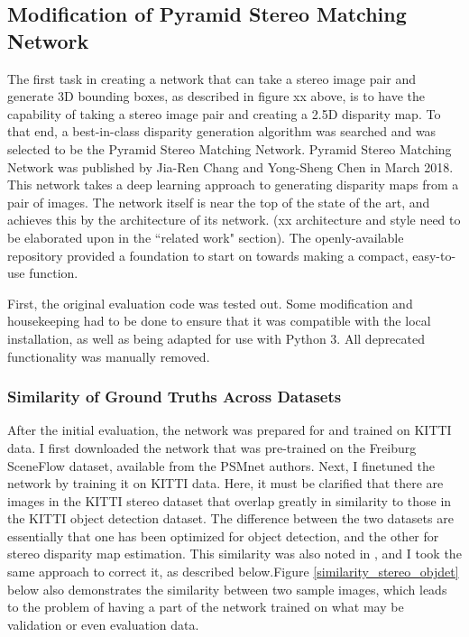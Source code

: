 \subsection{Modification of Pyramid Stereo Matching Network}
The first task in creating a network that can take a stereo image pair and generate 3D bounding boxes, as described in figure xx above, is to have the capability of taking a stereo image pair and creating a 2.5D disparity map. To that end, a best-in-class disparity generation algorithm was searched and was selected to be the Pyramid Stereo Matching Network. Pyramid Stereo Matching Network was published by Jia-Ren Chang and Yong-Sheng Chen in March 2018. This network takes a deep learning approach to generating disparity maps from a pair of images. The network itself is near the top of the state of the art, and achieves this by the architecture of its network. (xx architecture and style need to be elaborated upon in the ``related work" section). The openly-available repository provided a foundation to start on towards making a compact, easy-to-use function.

First, the original evaluation code was tested out. Some modification and housekeeping had to be done to ensure that it was compatible with the local installation, as well as being adapted for use with Python 3. All deprecated functionality was manually removed.

\subsubsection{Similarity of Ground Truths Across Datasets}
After the initial evaluation, the network was prepared for and trained on KITTI data. I first downloaded the network that was pre-trained on the Freiburg SceneFlow dataset, available from the PSMnet authors. Next, I finetuned the network by training it on KITTI data. Here, it must be clarified that there are images in the KITTI stereo dataset that overlap greatly in similarity to those in the KITTI object detection dataset. The difference between the two datasets are essentially that one has been optimized for object detection, and the other for stereo disparity map estimation. This similarity was also noted in \cite{wang_pseudo-lidar_2019}, and I took the same approach to correct it, as described below.Figure \ref{similarity_stereo_objdet} below also demonstrates the similarity between two sample images, which leads to the problem of having a part of the network trained on what may be validation or even evaluation data.

